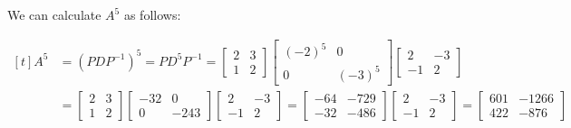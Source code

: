 \documentclass{article}
\begin{document}
\begin{itemize}
	We can calculate $A^5$ as follows:

	$\begin{aligned}[t]
		A^5
		&=\left(PDP^{-1}\right)^5
		=PD^5P^{-1}
		=\begin{bmatrix}
			2 & 3 \\
			1 & 2
		\end{bmatrix}
		\begin{bmatrix}
			(-2)^5 & 0 \\
			0 & (-3)^5
		\end{bmatrix}
		\begin{bmatrix}
			2 & -3 \\
			-1 & 2
		\end{bmatrix} \\
		&=\begin{bmatrix}
			2 & 3 \\
			1 & 2
		\end{bmatrix}
		\begin{bmatrix}
			-32 & 0 \\
			0 & -243
		\end{bmatrix}
		\begin{bmatrix}
			2 & -3 \\
			-1 & 2
		\end{bmatrix}
		=\begin{bmatrix}
			-64 & -729 \\
			-32 & -486
		\end{bmatrix}
		\begin{bmatrix}
			2 & -3 \\
			-1 & 2
		\end{bmatrix}
		=\begin{bmatrix}
			601 & -1266 \\
			422 & -876
		\end{bmatrix}
	\end{aligned}$


\end{itemize}
\end{document}
